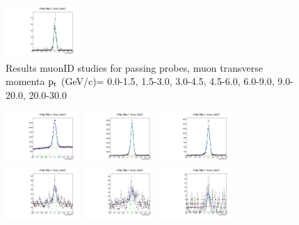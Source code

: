 \documentclass{article}
\begin{document}
\begin{figure}
    \includegraphics[width=0.25\textwidth]{../PlotsRooFitMC/croofit_id_pass_6.pdf}
    \caption{Results muonID studies for passing probes, muon transverse momenta
    $\rm p_{t}$ (GeV/c)= {0.0-1.5}, {1.5-3.0}, {3.0-4.5}, {4.5-6.0}, 
    {6.0-9.0}, {9.0-20.0}, {20.0-30.0}}
\end{figure}

\begin{figure}
    \includegraphics[width=0.25\textwidth]{../PlotsRooFitMC/croofit_id_fail_0.pdf}
    \includegraphics[width=0.25\textwidth]{../PlotsRooFitMC/croofit_id_fail_1.pdf}
    \includegraphics[width=0.25\textwidth]{../PlotsRooFitMC/croofit_id_fail_2.pdf}
    \includegraphics[width=0.25\textwidth]{../PlotsRooFitMC/croofit_id_fail_3.pdf}
    \includegraphics[width=0.25\textwidth]{../PlotsRooFitMC/croofit_id_fail_4.pdf}
    \includegraphics[width=0.25\textwidth]{../PlotsRooFitMC/croofit_id_fail_5.pdf}

\end{figure}
\end{document}
